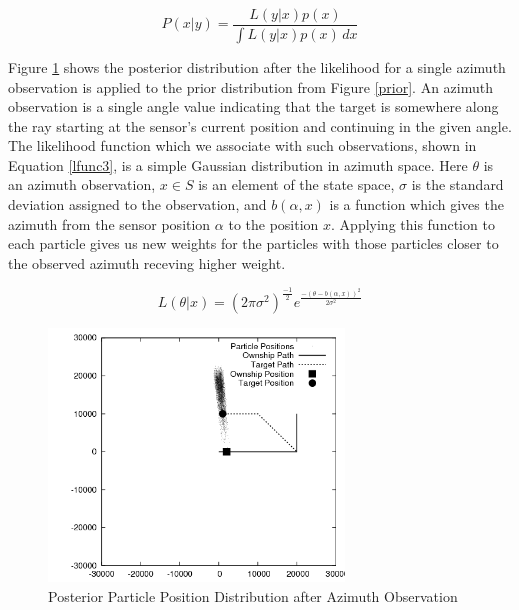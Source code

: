 \documentclass{article}
\begin{document}
\begin{equation}\label{lfunc2}
P(x|y) = \frac{L(y|x)p(x)}{\int \! L(y|x)p(x) \, dx}
\end{equation}

Figure \ref{posterior1} shows the posterior distribution after the likelihood for a single azimuth observation is applied to the prior distribution from Figure \ref{prior}. An azimuth observation is a single angle value indicating that the target is somewhere along the ray starting at the sensor's current position and continuing in the given angle. The likelihood function which we associate with such observations, shown in Equation \ref{lfunc3}, is a simple Gaussian distribution in azimuth space. Here \(\theta\) is an azimuth observation, \(x \in S\) is an element of the state space, \(\sigma\) is the standard deviation assigned to the observation, and \(b(\alpha,x)\) is a function which gives the azimuth from the sensor position \(\alpha\) to the position \(x\). Applying this function to each particle gives us new weights for the particles with those particles closer to the observed azimuth receving higher weight.

\begin{equation}\label{lfunc3}
L(\theta|x)=(2\pi\sigma^{2})^{\frac{-1}{2}}e^{\frac{-(\theta-b(\alpha,x))^{2}}{2\sigma^{2}}}
\end{equation}\cite{bmtt}

\begin{figure}
\centering
\includegraphics[width=0.7\textwidth]{data/particles_azimuth_obs.png}
\caption{Posterior Particle Position Distribution after Azimuth Observation}
\label{posterior1}
\end{figure}
\end{document}
